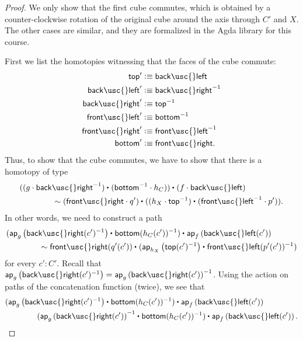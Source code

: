 \begin{proof}
  We only show that the first cube commutes, which is obtained by a counter-clockwise rotation of the original cube around the axis through $C'$ and $X$. The other cases are similar, and they are formalized in the Agda library for this course.

  First we list the homotopies witnessing that the faces of the cube commute:
  \begin{align*}
    \mathsf{top}' & \defeq \mathsf{back\usc{}left} \\
    \mathsf{back\usc{}left}' & \defeq \mathsf{back\usc{}right}^{-1} \\
    \mathsf{back\usc{}right}' & \defeq \mathsf{top}^{-1} \\
    \mathsf{front\usc{}left}' & \defeq \mathsf{bottom}^{-1} \\
    \mathsf{front\usc{}right}' & \defeq \mathsf{front\usc{}left}^{-1} \\
    \mathsf{bottom}' & \defeq \mathsf{front\usc{}right}. 
  \end{align*}
  Thus, to show that the cube commutes, we have to show that there is a homotopy of type
  \begin{align*}
    & \ct{(\ct{(g \cdot \mathsf{back\usc{}right}^{-1})}{(\mathsf{bottom}^{-1}\cdot h_C)})}{(f \cdot \mathsf{back\usc{}left})} \\
    & \qquad\qquad \htpy \ct{(\mathsf{front\usc{}right}\cdot q')}{(\ct{(h_X \cdot \mathsf{top}^{-1})}{(\mathsf{front\usc{}left}^{-1}\cdot p')})}.
  \end{align*}
  In other words, we need to construct a path
  \begin{align*}
    & \ct{(\ct{\ap{g}{\mathsf{back\usc{}right}(c')^{-1}}}{\mathsf{bottom}(h_C(c'))^{-1}})}{\ap{f}{\mathsf{back\usc{}left}(c')}} \\
    & \qquad\qquad \htpy \ct{\mathsf{front\usc{}right}(q'(c'))}{(\ct{\ap{h_X}{\mathsf{top}(c')^{-1}}}{\mathsf{front\usc{}left}(p'(c'))^{-1}})}
  \end{align*}
  for every $c':C'$. Recall that $\ap{g}{\mathsf{back\usc{}right}(c')^{-1}}=\ap{g}{\mathsf{back\usc{}right}(c')}^{-1}$. Using the action on paths of the concatenation function (twice), we see that
  \begin{align*}
    & \ct{(\ct{\ap{g}{\mathsf{back\usc{}right}(c')^{-1}}}{\mathsf{bottom}(h_C(c'))^{-1}})}{\ap{f}{\mathsf{back\usc{}left}(c')}} \\
    & \qquad\qquad \ct{(\ct{\ap{g}{\mathsf{back\usc{}right}(c')}^{-1}}{\mathsf{bottom}(h_C(c'))^{-1}})}{\ap{f}{\mathsf{back\usc{}left}(c')}}.

\end{align*}
\end{proof}
